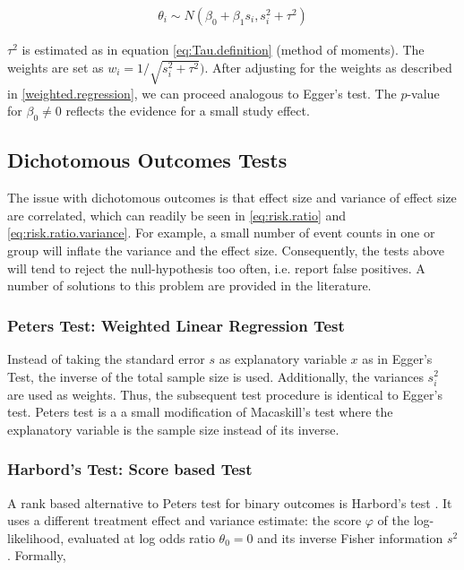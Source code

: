 \begin{align}
\theta_i \sim N(\beta_0 + \beta_1 s_i, s_i^2 + \tau^2) \label{t.sharp.regression}
\end{align}

$\tau^2$ is estimated as in equation \ref{eq:Tau.definition} (method of moments). %
The weights are set as $w_i = 1/\sqrt{s_i^2 + \tau^2})$. After adjusting for the weights as described in \ref{weighted.regression}, we can proceed analogous to Egger's test. The $p$-value for $\beta_{0} \neq 0$ reflects the evidence for a small study effect.

\subsection{Dichotomous Outcomes Tests}
 
The issue with dichotomous outcomes is that effect size and variance of effect size are correlated, which can readily be seen in \ref{eq:risk.ratio} and \ref{eq:risk.ratio.variance}. For example, a small number of event counts in one or group will inflate the variance and the effect size. Consequently, the tests above will tend to reject the null-hypothesis too often, i.e. report false positives. A number of solutions to this problem are provided in the literature.


\subsubsection{Peters Test: Weighted Linear Regression Test} \label{sec:Peter}
Instead of taking the standard error $s$ as explanatory variable $x$ as in Egger's Test, the inverse of the total sample size is used. Additionally, the variances $s_i^2$ are used as weights. Thus, the subsequent test procedure is identical to Egger's test. Peters test is a a small modification of Macaskill's test where the explanatory variable is the sample size instead of its inverse.


\subsubsection{Harbord's Test: Score based Test} \label{sec:Harbord}
A rank based alternative to Peters test for binary outcomes is Harbord's test \citep{Harbord}.
It uses a different treatment effect and variance estimate: the score $\varphi$ of the log-likelihood, evaluated at log odds ratio $\theta_0 = 0$ and its inverse Fisher information $s^2$. Formally,

